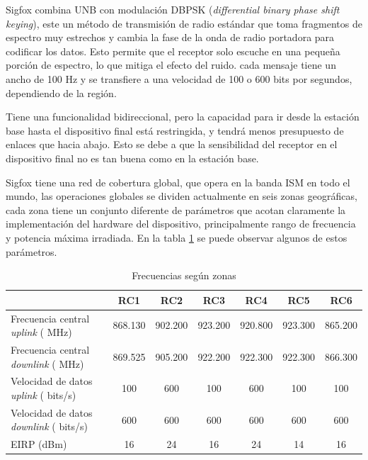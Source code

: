 Sigfox combina UNB con modulación  DBPSK (\textit{differential binary phase shift keying}), este un método de transmisión de radio estándar que toma fragmentos de espectro muy estrechos y cambia la fase de la onda de radio portadora para codificar los datos. Esto permite que el receptor solo escuche en una pequeña porción de espectro, lo que mitiga el efecto del ruido. cada mensaje tiene un ancho de 100 Hz y se transfiere a una velocidad de 100 o 600 bits por segundos, dependiendo de la región. %

Tiene una funcionalidad bidireccional, pero la capacidad para ir desde la estación base hasta el dispositivo final está restringida, y tendrá menos presupuesto de enlaces que hacia abajo. Esto se debe a que la sensibilidad del receptor en el dispositivo final no es tan buena como en la estación base.

Sigfox tiene una red de cobertura global, que opera en la banda ISM en todo el mundo, las operaciones globales se dividen actualmente en seis  zonas geográficas, cada zona tiene un conjunto diferente de parámetros que acotan claramente la implementación del hardware del dispositivo, principalmente rango de frecuencia y potencia máxima irradiada. En la tabla \ref{tab:ZonasSigfox} se puede observar algunos de estos parámetros.

\begin{table}[h]
	\centering
	\caption[Zonas de frecuencia]{Frecuencias según zonas}
	\begin{tabular}{l c c c c c c}    
		\toprule
		\textbf{ } 	   & \textbf{RC1} & \textbf{RC2} 	& \textbf{RC3}  & \textbf{RC4}   & \textbf{RC5}	& \textbf{RC6} \\
		\midrule
		Frecuencia central \textit{uplink} ( MHz)	    & 868.130 	& 902.200	&923.200  &920.800	&923.300 &865.200\\	
		Frecuencia central \textit{downlink} ( MHz) 	& 869.525	& 905.200   &922.200 &922.300	&922.300	&866.300\\
		Velocidad de datos \textit{uplink} ( bits/s)	& 100       &600        &100     &600       &100        &100\\	
		Velocidad de datos \textit{downlink} ( bits/s)	& 600       & 600    	&600     & 600       & 600    	&600\\
		EIRP (dBm)		                             	 & 16       & 24		&16     &24	        &14         &16\\
		\bottomrule
		\hline
	\end{tabular}
	\label{tab:ZonasSigfox}
\end{table}

